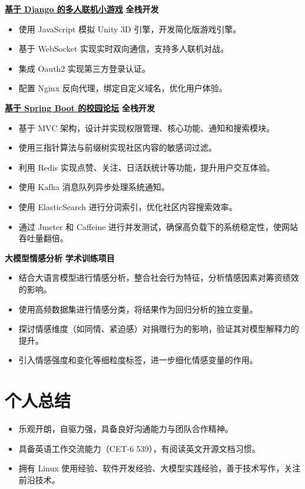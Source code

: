 \documentclass{resume}
\begin{document}
\textbf{\href{https://app6534.acapp.acwing.com.cn/}{基于 Django 的多人联机小游戏}} \hfill \textbf{全栈开发}
\begin{itemize}
    \item 使用 JavaScript 模拟 Unity 3D 引擎，开发简化版游戏引擎。
    \item 基于 WebSocket 实现实时双向通信，支持多人联机对战。
    \item 集成 Oauth2 实现第三方登录认证。
    \item 配置 Nginx 反向代理，绑定自定义域名，优化用户体验。
\end{itemize}

\textbf{\href{http://116.198.216.39/}{基于 Spring Boot 的校园论坛}} \hfill \textbf{全栈开发}
\begin{itemize}
    \item 基于 MVC 架构，设计并实现权限管理、核心功能、通知和搜索模块。
    \item 使用三指针算法与前缀树实现社区内容的敏感词过滤。
    \item 利用 Redis 实现点赞、关注、日活跃统计等功能，提升用户交互体验。
    \item 使用 Kafka 消息队列异步处理系统通知。
    \item 使用 ElasticSearch 进行分词索引，优化社区内容搜索效率。
    \item 通过 Jmeter 和 Caffeine 进行并发测试，确保高负载下的系统稳定性，使网站吞吐量翻倍。
\end{itemize}

\textbf{大模型情感分析} \hfill \textbf{学术训练项目}
\begin{itemize}
    \item 结合大语言模型进行情感分析，整合社会行为特征，分析情感因素对筹资绩效的影响。
    \item 使用高频数据集进行情感分类，将结果作为回归分析的独立变量。
    \item 探讨情感维度（如同情、紧迫感）对捐赠行为的影响，验证其对模型解释力的提升。
    \item 引入情感强度和变化等细粒度标签，进一步细化情感变量的作用。
\end{itemize}

\section{个人总结}

\begin{itemize}
    \item 乐观开朗，自驱力强，具备良好沟通能力与团队合作精神。
    \item 具备英语工作交流能力（CET-6 539），有阅读英文开源文档习惯。
    \item 拥有 Linux 使用经验、软件开发经验、大模型实践经验，善于技术写作，关注前沿技术。
\end{itemize}
\end{document}
